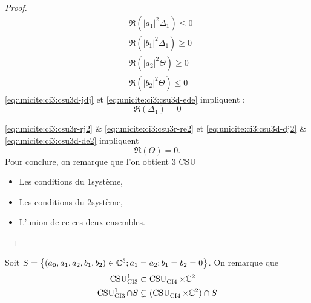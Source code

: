 \begin{proof}
\begin{minipage}{0.49\textwidth}
\begin{align}
        \label{eq:unicite:ci3:csu3d-jdj}&\Re\left(|a_1|^2\Delta_1\right) \le 0 \\
        \label{eq:unicite:ci3:csu3d-ede}&\Re\left(|b_1|^2\Delta_1\right) \ge 0 \\
        \label{eq:unicite:ci3:csu3d-dj2}&\Re\left(|a_2|^2\Theta\right)\ge 0\\
        \label{eq:unicite:ci3:csu3d-de2}&\Re\left(|b_2|^2\Theta\right)\le 0
      \end{align}
      \eqref{eq:unicite:ci3:csu3d-jdj} et \eqref{eq:unicite:ci3:csu3d-ede} impliquent :
      \begin{equation}
        \Re\left(\Delta_1\right) = 0
      \end{equation}
    \end{minipage}
     \eqref{eq:unicite:ci3:csu3r-rj2} \& \eqref{eq:unicite:ci3:csu3r-re2} et \eqref{eq:unicite:ci3:csu3d-dj2} \& \eqref{eq:unicite:ci3:csu3d-de2} impliquent
    \begin{equation}
      \Re\left(\Theta\right) = 0.
    \end{equation}
    Pour conclure, on remarque que l'on obtient 3 CSU
    \begin{itemize}
      \item Les conditions du 1\ier système,
      \item Les conditions du 2\ieme système,
      \item L'union de ce ces deux ensembles.
    \end{itemize}
  \end{proof}

  Soit \(S = \left\lbrace (a_0,a_1,a_2,b_1,b_2) \in \CC^5 ; a_1 = a_2 ; b_1 = b_2 = 0 \right\rbrace \). On remarque que
  \begin{align}
    \CSU[1]{CI3} & \subset \CSU{CI4}\times\CC^2
    \\
    \CSU[1]{CI3}\cap S & \subsetneq (\CSU{CI4}\times\CC^2)\cap S 
  \end{align}

